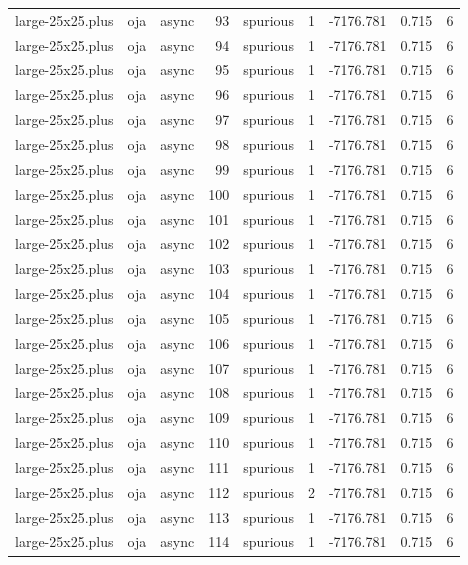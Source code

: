 \begin{tabular}{lllrlrrrr}
large-25x25.plus & oja & async & 93 & spurious & 1 & -7176.781 & 0.715 & 6 \\
large-25x25.plus & oja & async & 94 & spurious & 1 & -7176.781 & 0.715 & 6 \\
large-25x25.plus & oja & async & 95 & spurious & 1 & -7176.781 & 0.715 & 6 \\
large-25x25.plus & oja & async & 96 & spurious & 1 & -7176.781 & 0.715 & 6 \\
large-25x25.plus & oja & async & 97 & spurious & 1 & -7176.781 & 0.715 & 6 \\
large-25x25.plus & oja & async & 98 & spurious & 1 & -7176.781 & 0.715 & 6 \\
large-25x25.plus & oja & async & 99 & spurious & 1 & -7176.781 & 0.715 & 6 \\
large-25x25.plus & oja & async & 100 & spurious & 1 & -7176.781 & 0.715 & 6 \\
large-25x25.plus & oja & async & 101 & spurious & 1 & -7176.781 & 0.715 & 6 \\
large-25x25.plus & oja & async & 102 & spurious & 1 & -7176.781 & 0.715 & 6 \\
large-25x25.plus & oja & async & 103 & spurious & 1 & -7176.781 & 0.715 & 6 \\
large-25x25.plus & oja & async & 104 & spurious & 1 & -7176.781 & 0.715 & 6 \\
large-25x25.plus & oja & async & 105 & spurious & 1 & -7176.781 & 0.715 & 6 \\
large-25x25.plus & oja & async & 106 & spurious & 1 & -7176.781 & 0.715 & 6 \\
large-25x25.plus & oja & async & 107 & spurious & 1 & -7176.781 & 0.715 & 6 \\
large-25x25.plus & oja & async & 108 & spurious & 1 & -7176.781 & 0.715 & 6 \\
large-25x25.plus & oja & async & 109 & spurious & 1 & -7176.781 & 0.715 & 6 \\
large-25x25.plus & oja & async & 110 & spurious & 1 & -7176.781 & 0.715 & 6 \\
large-25x25.plus & oja & async & 111 & spurious & 1 & -7176.781 & 0.715 & 6 \\
large-25x25.plus & oja & async & 112 & spurious & 2 & -7176.781 & 0.715 & 6 \\
large-25x25.plus & oja & async & 113 & spurious & 1 & -7176.781 & 0.715 & 6 \\
large-25x25.plus & oja & async & 114 & spurious & 1 & -7176.781 & 0.715 & 6 \\

\end{tabular}
